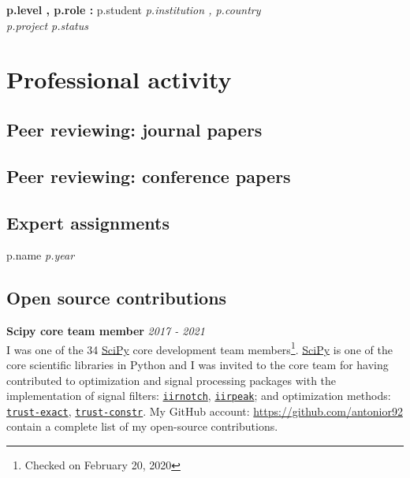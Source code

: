 \documentclass[10pt,letterpaper]{article} %
\begin{document}
{{{{{{{{{{{%
{\bf {{ p.level }}, {{ p.role }}: } {{ p.student }}  \hfill {\em {{ p.institution }}, {{ p.country }} }\\
\textit{ {{ p.project }} } \hfill {\em   {{ p.status }} } \\ {%


\section*{Professional activity}

\subsection*{Peer reviewing: journal papers}

{%

\subsection*{Peer reviewing: conference papers}

{%

\subsection*{Expert assignments}

{%
        {{ p.name }} \hfill {\em {{ p.year }} }
{%

\subsection*{Open source contributions}

{\bf Scipy  core team member} \hfill {\em 2017 - 2021} \\
I was one of the 34 \href{https://www.scipy.org}{SciPy} core development  team members\footnote{Checked on February 20, 2020}.
\href{https://www.scipy.org}{SciPy} is one of the core scientific libraries in Python and I was invited to the core team
for having contributed to optimization and signal processing packages with the implementation of signal filters:
\href{http://scipy.github.io/devdocs/generated/scipy.signal.iirnotch.html}{\texttt{iirnotch}},
    \href{http://scipy.github.io/devdocs/generated/scipy.signal.iirpeak.html}{\texttt{iirpeak}};
    and optimization methods: \href{http://scipy.github.io/devdocs/optimize.minimize-trustexact.html}{\texttt{trust-exact}}, \href{http://scipy.github.io/devdocs/optimize.minimize-trustconstr.html}{\texttt{trust-constr}}. My GitHub account: \href{https://github.com/antonior92}{https://github.com/antonior92} contain a complete list of my open-source contributions.

}}}}}}}}}}}}}}}}
\end{document}
